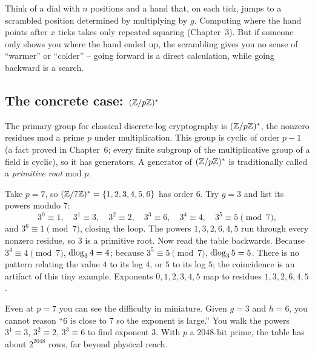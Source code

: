 \begin{intuitionbox}
Think of a dial with $n$ positions and a hand that, on each tick, jumps to a scrambled position determined by multiplying by $g$. Computing where the hand points after $x$ ticks takes only repeated squaring (Chapter~3). But if someone only shows you where the hand ended up, the scrambling gives you no sense of ``warmer'' or ``colder'' -- going forward is a direct calculation, while going backward is a search.
\end{intuitionbox}

\subsection{The concrete case: \texorpdfstring{$(\mathbb{Z}/p\mathbb{Z})^{*}$}{Z\_p*}}

The primary group for classical discrete-log cryptography is $(\mathbb{Z}/p\mathbb{Z})^{*}$, the nonzero residues mod a
prime $p$ under multiplication. This group is cyclic of order $p-1$ (a fact proved in Chapter~6;
every finite subgroup of the multiplicative group of a field is cyclic), so it has
generators. A generator of $(\mathbb{Z}/p\mathbb{Z})^{*}$ is traditionally called a \emph{primitive root} mod $p$.

\begin{example}
\label{ch20:ex-modp}
Take $p = 7$, so $(\mathbb{Z}/7\mathbb{Z})^{*} = \{1,2,3,4,5,6\}$ has order $6$. Try $g = 3$ and list its powers modulo $7$:
\[
  3^0 \equiv 1,\quad 3^1 \equiv 3,\quad 3^2 \equiv 2,\quad 3^3 \equiv 6,\quad 3^4 \equiv 4,\quad 3^5 \equiv 5 \pmod 7,
\]
and $3^6 \equiv 1 \pmod 7$, closing the loop. The powers $1,3,2,6,4,5$ run through every nonzero residue, so $3$
is a primitive root. Now read the table backwards. Because $3^4 \equiv 4 \pmod 7$, $\operatorname{dlog}_3 4 = 4$; because
$3^5 \equiv 5 \pmod 7$, $\operatorname{dlog}_3 5 = 5$. There is no pattern relating the value $4$ to its log $4$, or $5$ to
its log $5$; the coincidence is an artifact of this tiny example. Exponents $0,1,2,3,4,5$
map to residues $1,3,2,6,4,5$.
\end{example}

Even at $p=7$ you can see the difficulty in miniature. Given $g=3$ and $h=6$,
you cannot reason ``$6$ is close to $7$ so the exponent is large.'' You walk the
powers $3^1 \equiv 3$, $3^2 \equiv 2$, $3^3 \equiv 6$ to find exponent $3$. With $p$ a $2048$-bit prime, the table has about $2^{2048}$
rows, far beyond physical reach.

